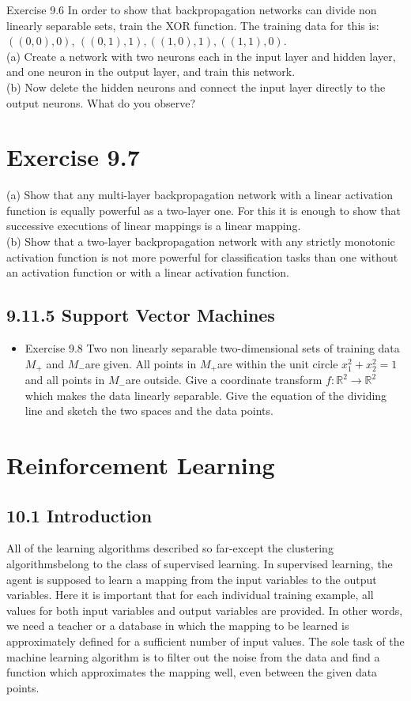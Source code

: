 \documentclass[10pt]{article}
\begin{document}
Exercise 9.6 In order to show that backpropagation networks can divide non linearly separable sets, train the XOR function. The training data for this is: $((0,0), 0)$, $((0,1), 1),((1,0), 1),((1,1), 0)$.\\
(a) Create a network with two neurons each in the input layer and hidden layer, and one neuron in the output layer, and train this network.\\
(b) Now delete the hidden neurons and connect the input layer directly to the output neurons. What do you observe?

\section*{Exercise 9.7}
(a) Show that any multi-layer backpropagation network with a linear activation function is equally powerful as a two-layer one. For this it is enough to show that successive executions of linear mappings is a linear mapping.\\
(b) Show that a two-layer backpropagation network with any strictly monotonic activation function is not more powerful for classification tasks than one without an activation function or with a linear activation function.

\subsection*{9.11.5 Support Vector Machines}
\begin{itemize}
  \item Exercise 9.8 Two non linearly separable two-dimensional sets of training data $M_{+}$ and $M_{-}$are given. All points in $M_{+}$are within the unit circle $x_{1}^{2}+x_{2}^{2}=1$ and all points in $M_{-}$are outside. Give a coordinate transform $f: \mathbb{R}^{2} \rightarrow \mathbb{R}^{2}$ which makes the data linearly separable. Give the equation of the dividing line and sketch the two spaces and the data points.
\end{itemize}

\section*{Reinforcement Learning}
\subsection*{10.1 Introduction}
All of the learning algorithms described so far-except the clustering algorithmsbelong to the class of supervised learning. In supervised learning, the agent is supposed to learn a mapping from the input variables to the output variables. Here it is important that for each individual training example, all values for both input variables and output variables are provided. In other words, we need a teacher or a database in which the mapping to be learned is approximately defined for a sufficient number of input values. The sole task of the machine learning algorithm is to filter out the noise from the data and find a function which approximates the mapping well, even between the given data points.
\end{document}
